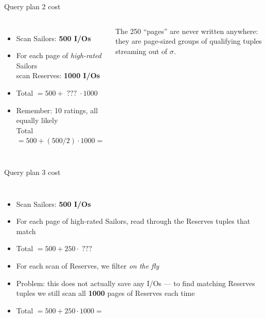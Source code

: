 \begin{frame}{Query plan 2 cost }
  \begin{columns}[c]
      \begin{itemize}
        \item Scan Sailors: \textbf{500 I/Os}
        \item For each page of \emph{high-rated} Sailors\\ scan Reserves: \textbf{1000 I/Os}
        \item Total $= 500 + \;???\; \cdot 1000$
        \item Remember: 10 ratings, all equally likely\\
              Total $= 500 + (500/2)\cdot 1000 =$ 
      \end{itemize}
      \begin{notebox}
        The 250 ``pages'' are never written anywhere: they are page-sized groups of qualifying tuples streaming out of $\sigma$.
      \end{notebox}
      \planbox[hl]{56mm}{\PlanTwo}
  \end{columns}
\end{frame}



\begin{frame}{Query plan 3 cost }
  \begin{columns}[c]
      \begin{itemize}
        \item Scan Sailors: \textbf{500 I/Os}
        \item For each page of high-rated Sailors, read through the Reserves tuples that match
        \item Total $= 500 + 250 \cdot \;???$
        \item For each scan of Reserves, we filter \emph{on the fly}
        \item \alert{Problem:} this does not actually save any I/Os --- to find matching Reserves tuples
              we still scan all \textbf{1000} pages of Reserves each time
        \item Total $= 500 + 250 \cdot 1000 =$ 
      \end{itemize}
      \planbox[hl]{56mm}{\PlanThree}
  \end{columns}
\end{frame}

